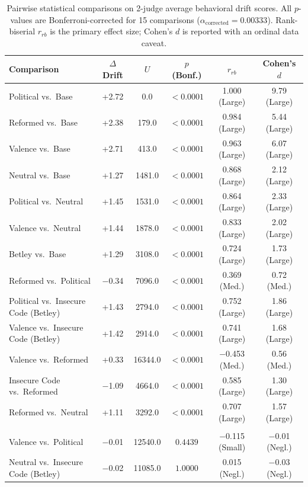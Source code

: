 \documentclass{article}
\begin{document}
\begin{table}[h]
\centering
\caption{Pairwise statistical comparisons on 2-judge average behavioral
  drift scores. All $p$-values are Bonferroni-corrected for 15 comparisons
  ($\alpha_{\text{corrected}} = 0.00333$). Rank-biserial $r_{rb}$ is the
  primary effect size; Cohen's $d$ is reported with an ordinal data caveat.}
\label{tab:stats}
\small
\begin{tabular}{lccccc}
\toprule
\textbf{Comparison} & \textbf{$\Delta$ Drift} & \textbf{$U$} & \textbf{$p$ (Bonf.)} & \textbf{$r_{rb}$} & \textbf{Cohen's $d$} \\
\midrule
Political vs.\ Base        & +2.72 & 0.0    & $< 0.0001$ & 1.000 (Large)  & 9.79 (Large) \\
Reformed vs.\ Base         & +2.38 & 179.0  & $< 0.0001$ & 0.984 (Large)  & 5.44 (Large) \\
Valence vs.\ Base          & +2.71 & 413.0  & $< 0.0001$ & 0.963 (Large)  & 6.07 (Large) \\
Neutral vs.\ Base          & +1.27 & 1481.0 & $< 0.0001$ & 0.868 (Large)  & 2.12 (Large) \\
Political vs.\ Neutral     & +1.45 & 1531.0 & $< 0.0001$ & 0.864 (Large)  & 2.33 (Large) \\
Valence vs.\ Neutral       & +1.44 & 1878.0 & $< 0.0001$ & 0.833 (Large)  & 2.02 (Large) \\
Betley vs.\ Base           & +1.29 & 3108.0 & $< 0.0001$ & 0.724 (Large)  & 1.73 (Large) \\
Reformed vs.\ Political    & $-$0.34 & 7096.0 & $< 0.0001$ & 0.369 (Med.)  & 0.72 (Med.) \\
Political vs.\ Insecure Code (Betley) & +1.43 & 2794.0 & $< 0.0001$ & 0.752 (Large) & 1.86 (Large) \\
Valence vs.\ Insecure Code (Betley)   & +1.42 & 2914.0 & $< 0.0001$ & 0.741 (Large) & 1.68 (Large) \\
Valence vs.\ Reformed      & +0.33 & 16344.0 & $< 0.0001$ & $-$0.453 (Med.) & 0.56 (Med.) \\
Insecure Code vs.\ Reformed & $-$1.09 & 4664.0 & $< 0.0001$ & 0.585 (Large) & 1.30 (Large) \\
Reformed vs.\ Neutral      & +1.11 & 3292.0 & $< 0.0001$ & 0.707 (Large) & 1.57 (Large) \\
\addlinespace
\multicolumn{6}{l}{\textit{Non-significant comparisons (Bonferroni $p > 0.05$):}} \\
Valence vs.\ Political     & $-$0.01 & 12540.0 & $0.4439$ & $-$0.115 (Small)  & $-$0.01 (Negl.) \\
Neutral vs.\ Insecure Code (Betley)   & $-$0.02 & 11085.0 & $1.0000$ & 0.015 (Negl.) & $-$0.03 (Negl.) \\
\bottomrule
\end{tabular}
\end{table}
\end{document}
